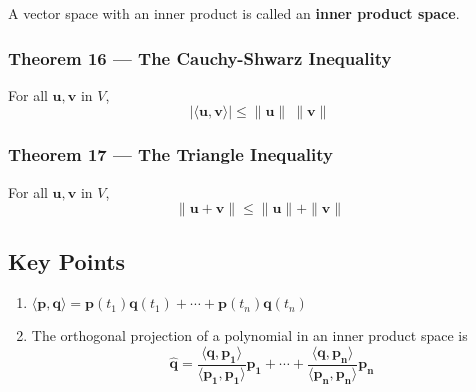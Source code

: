 \documentclass{article}
\begin{document}
A vector space with an inner product is called an \textbf{inner product space}.

\subsubsection*{Theorem 16 --- The Cauchy-Shwarz Inequality}
For all $\mathbf{u}, \mathbf{v}$ in $V$,
\[|\langle\mathbf{u},\mathbf{v}\rangle |\leq\|\mathbf{u}\|\:\|\mathbf{v}\|\]

\subsubsection*{Theorem 17 --- The Triangle Inequality}
For all $\mathbf{u}, \mathbf{v}$ in $V$,
\[\|\mathbf{u} + \mathbf{v}\| \leq \|\mathbf{u}\| + \|\mathbf{v}\|\]

\subsection*{Key Points}
\begin{enumerate}
    \item $\langle\mathbf{p},\mathbf{q}\rangle=\mathbf{p}(t_1)\mathbf{q}(t_1) + \cdots +
    \mathbf{p}(t_n)\mathbf{q}(t_n)$
    \item The orthogonal projection of a polynomial in an inner product space is 
    \[\mathbf{\hat{q}}=\frac{\langle\mathbf{q},\mathbf{p_1}\rangle}{\langle\mathbf{p_1},
    \mathbf{p_1}\rangle} \mathbf{p_1} + \cdots + \frac{\langle\mathbf{q},\mathbf{p_n}\rangle}
    {\langle\mathbf{p_n}, \mathbf{p_n}\rangle} \mathbf{p_n}\]
\end{enumerate}
\end{document}
